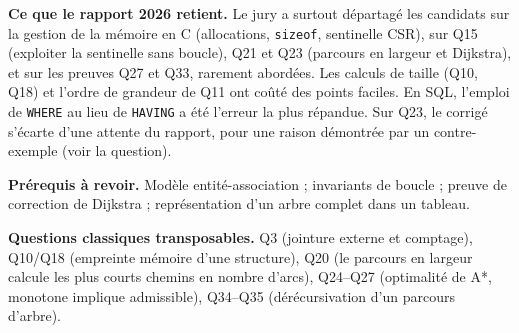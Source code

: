 \documentclass[11pt,a4paper]{article}
\begin{document}
\textbf{Ce que le rapport 2026 retient.} Le jury a surtout départagé les candidats sur la gestion de la mémoire en C (allocations, \texttt{sizeof}, sentinelle CSR), sur Q15 (exploiter la sentinelle sans boucle), Q21 et Q23 (parcours en largeur et Dijkstra), et sur les preuves Q27 et Q33, rarement abordées. Les calculs de taille (Q10, Q18) et l'ordre de grandeur de Q11 ont coûté des points faciles. En SQL, l'emploi de \texttt{WHERE} au lieu de \texttt{HAVING} a été l'erreur la plus répandue. Sur Q23, le corrigé s'écarte d'une attente du rapport, pour une raison démontrée par un contre-exemple (voir la question).

\textbf{Prérequis à revoir.} Modèle entité-association ; invariants de boucle ; preuve de correction de Dijkstra ; représentation d'un arbre complet dans un tableau.

\textbf{Questions classiques transposables.} Q3 (jointure externe et comptage), Q10/Q18 (empreinte mémoire d'une structure), Q20 (le parcours en largeur calcule les plus courts chemins en nombre d'arcs), Q24--Q27 (optimalité de A*, monotone implique admissible), Q34--Q35 (dérécursivation d'un parcours d'arbre).
\end{document}
